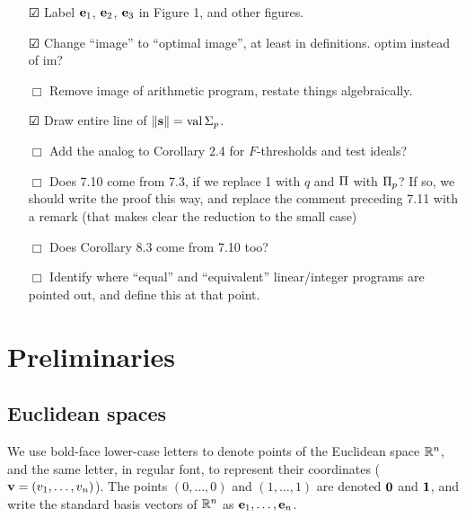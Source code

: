 \documentclass[11pt]{amsart}
\begin{document}
{\begin{itemize}
      \item[$\CheckedBox$] Label $\mathbf{e}_1$, $\mathbf{e}_2$, $\mathbf{e}_3$ in Figure 1, and other figures.
      \item[$\CheckedBox$] Change ``image'' to ``optimal image'', at least in definitions. optim instead of im?
      \item[$\Box$] Remove image of arithmetic program, restate things algebraically.
      \item[$\CheckedBox$] Draw entire line of $\| \mathbf{s} \| = \operatorname{val} \Sigma_p$.
      \item[$\Box$] Add the analog to Corollary 2.4 for $F$-thresholds and test ideals?
      \item[$\Box$] Does 7.10 come from 7.3, if we replace 1 with $q$ and $\Pi$ with $\Pi_p$? If so, we should write the proof this way, and replace the comment preceding 7.11 with a remark (that makes clear the reduction to the small case)
      \item[$\Box$] Does Corollary 8.3 come from 7.10 too?
      \item[$\Box$] Identify where ``equal'' and ``equivalent'' linear/integer programs are pointed out, and define this at that point.
   \end{itemize}
}

\newpage




\section{Preliminaries}

\subsection{Euclidean spaces}
\label{ss: euclidean spaces and convexity}
We use bold-face lower-case letters to denote points of the Euclidean space $\mathbb{R}^n$, and the same letter, in regular font, to represent their coordinates (\eg $\mathbf{v}=(v_1,\ldots,v_n)$).
The points $(0,\ldots,0)$ and $(1,\ldots,1)$ are denoted $\mathbf{0}$ and $\mathbf{1}$, and write the standard basis vectors of $\mathbb{R}^n$ as $\mathbf{e}_1,\ldots,\mathbf{e}_n$.
\end{document}
